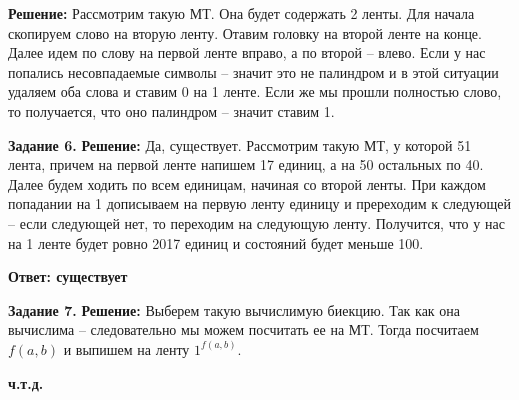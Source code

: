 \documentclass[12pt,a4paper]{scrartcl}
\begin{document}
	\textbf{Решение:}
	\newline
	\indent
	Рассмотрим такую МТ. Она будет содержать 2 ленты. Для начала скопируем слово на вторую ленту. Отавим головку на второй ленте на конце. Далее идем по слову на первой ленте вправо, а по второй -- влево. Если у нас попались несовпадаемые символы -- значит это не палиндром и в этой ситуации удаляем оба слова и ставим 0 на 1 ленте. Если же мы прошли полностью слово, то получается, что оно палиндром -- значит ставим 1.
	\begin{flushright}	
	\textbf{}
	\end{flushright}
	\textbf{Задание 6.} 
	\newline
	\textbf{Решение:}
	\newline
	\indent
	Да, существует. Рассмотрим такую МТ, у которой 51 лента, причем на первой ленте напишем 17 единиц, а на 50 остальных по 40. Далее будем ходить по всем единицам, начиная со второй ленты. При каждом попадании на 1 дописываем на первую ленту единицу и пререходим к следующей -- если следующей нет, то переходим на следующую ленту. Получится, что у нас на 1 ленте будет ровно 2017 единиц и состояний будет меньше 100.
	\begin{flushright}	
		\textbf{Ответ: существует}
	\end{flushright}
	\textbf{Задание 7.} 
	\newline
	\textbf{Решение:}
	\newline
	\indent
	Выберем такую вычислимую биекцию. Так как она вычислима -- следовательно мы можем посчитать ее на МТ. Тогда посчитаем $f(a, b)$ и выпишем на ленту $1^{f(a, b)}$. 
	\begin{flushright}	
		\textbf{ч.т.д.}
	\end{flushright}
\end{document}
